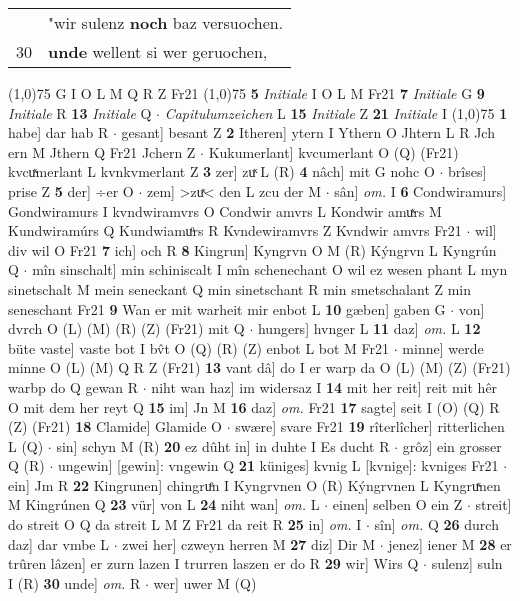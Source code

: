 \documentclass[8pt,a4paper,notitlepage]{article}
\begin{document}
\begin{table}[ht]
\begin{minipage}[t]{0.5\linewidth}
\begin{tabular}{rl}
 & "wir sulenz \textbf{noch} baz versuochen.\\ 
30 & \textbf{unde} wellent si wer geruochen,\\ 
\end{tabular}
\scriptsize
\line(1,0){75} \newline
G I O L M Q R Z Fr21 \newline
\line(1,0){75} \newline
\textbf{5} \textit{Initiale} I O L M Fr21  \textbf{7} \textit{Initiale} G  \textbf{9} \textit{Initiale} R  \textbf{13} \textit{Initiale} Q   $\cdot$ \textit{Capitulumzeichen} L  \textbf{15} \textit{Initiale} Z  \textbf{21} \textit{Initiale} I  \newline
\line(1,0){75} \newline
\textbf{1} habe] dar hab R  $\cdot$ gesant] besant Z \textbf{2} Itheren] ytern I Ythern O Jhtern L R Jch ern M Jthern Q Fr21 Jchern Z  $\cdot$ Kukumerlant] kvcumerlant O (Q) (Fr21) kvcuͯmerlant L kvnkvmerlant Z \textbf{3} zer] zuͯ L (R) \textbf{4} nâch] mit G nohc O  $\cdot$ brîses] prise Z \textbf{5} der] ÷er O  $\cdot$ zem] >zuͯ< den L zcu der M  $\cdot$ sân] \textit{om.} I \textbf{6} Condwiramurs] Gondwiramurs I kvndwiramvrs O Condwir amvrs L Kondwir amuͯrs M Kundwiramúrs Q Kundwiamuͦrs R Kvndewiramvrs Z Kvndwir amvrs Fr21  $\cdot$ wil] div wil O Fr21 \textbf{7} ich] och R \textbf{8} Kingrun] Kyngrvn O M (R) Kýngrvn L Kyngrún Q  $\cdot$ mîn sinschalt] min schiniscalt I mîn schenechant O wil ez wesen phant L myn sinetschalt M mein seneckant Q min sinetschant R min smetschalant Z min seneschant Fr21 \textbf{9} Wan er mit warheit mir enbot L \textbf{10} gæben] gaben G  $\cdot$ von] dvrch O (L) (M) (R) (Z) (Fr21) mit Q  $\cdot$ hungers] hvnger L \textbf{11} daz] \textit{om.} L \textbf{12} büte vaste] vaste bot I bv̂t O (Q) (R) (Z) enbot L bot M Fr21  $\cdot$ minne] werde minne O (L) (M) Q R Z (Fr21) \textbf{13} vant dâ] do I er warp da O (L) (M) (Z) (Fr21) warbp do Q gewan R  $\cdot$ niht wan haz] im widersaz I \textbf{14} mit her reit] reit mit hêr O mit dem her reyt Q \textbf{15} im] Jn M \textbf{16} daz] \textit{om.} Fr21 \textbf{17} sagte] seit I (O) (Q) R (Z) (Fr21) \textbf{18} Clamide] Glamide O  $\cdot$ swære] svare Fr21 \textbf{19} rîterlîcher] ritterlichen L (Q)  $\cdot$ sin] schyn M (R) \textbf{20} ez dûht in] in duhte I Es ducht R  $\cdot$ grôz] ein grosser Q (R)  $\cdot$ ungewin] [gewin]: vngewin Q \textbf{21} küniges] kvnig L [kvnige]: kvniges Fr21  $\cdot$ ein] Jm R \textbf{22} Kingrunen] chingruͤn I Kyngrvnen O (R) Kýngrvnen L Kyngruͯnen M Kingrúnen Q \textbf{23} vür] von L \textbf{24} niht wan] \textit{om.} L  $\cdot$ einen] selben O ein Z  $\cdot$ streit] do streit O Q da streit L M Z Fr21 da reit R \textbf{25} in] \textit{om.} I  $\cdot$ sîn] \textit{om.} Q \textbf{26} durch daz] dar vmbe L  $\cdot$ zwei her] czweyn herren M \textbf{27} diz] Dir M  $\cdot$ jenez] iener M \textbf{28} er trûren lâzen] er zurn lazen I trurren laszen er do R \textbf{29} wir] Wirs Q  $\cdot$ sulenz] suln I (R) \textbf{30} unde] \textit{om.} R  $\cdot$ wer] uwer M (Q) \newline

\end{minipage}
\end{table}
\end{document}
